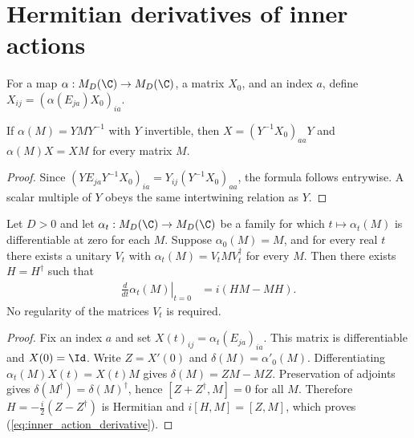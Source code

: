\section{Hermitian derivatives of inner actions}
\label{sec:hermitian_inner_action_derivatives}

\begin{definition}
    \label{def:matrix_unit_conjugator}
    \leanok
    For a map $\alpha:M_D(\C)\to M_D(\C)$, a matrix $X_0$, and an
    index $a$, define $X_{ij}=(\alpha(E_{ja})X_0)_{ia}$.
\end{definition}

\begin{theorem}
    \label{thm:matrix_unit_conjugator_intertwines}
    \leanok
    If $\alpha(M)=YMY^{-1}$ with $Y$ invertible, then
    $X=(Y^{-1}X_0)_{aa}Y$ and $\alpha(M)X=XM$ for every matrix $M$.
\end{theorem}
\begin{proof}\leanok
    Since $(YE_{ja}Y^{-1}X_0)_{ia}=Y_{ij}(Y^{-1}X_0)_{aa}$,
    the formula follows entrywise. A scalar multiple of $Y$ obeys
    the same intertwining relation as $Y$.
\end{proof}

\begin{theorem}
    \label{thm:hermitian_inner_action_derivative}
    \leanok
    Let $D>0$ and let $\alpha_t:M_D(\C)\to M_D(\C)$ be a family
    for which $t\mapsto\alpha_t(M)$ is differentiable at zero for each $M$.
    Suppose $\alpha_0(M)=M$, and for every real $t$ there exists a unitary
    $V_t$ with $\alpha_t(M)=V_tMV_t^\dagger$ for every $M$.
    Then there exists $H=H^\dagger$ such that
    \begin{align}
        \left.\frac{d}{dt}\alpha_t(M)\right|_{t=0}
         & =i(HM-MH).
        \label{eq:inner_action_derivative}
    \end{align}
    No regularity of the matrices $V_t$ is required.
\end{theorem}
\begin{proof}\leanok
    Fix an index $a$ and set $X(t)_{ij}=\alpha_t(E_{ja})_{ia}$.
    This matrix is differentiable and $X(0)=\Id$. Write $Z=X'(0)$ and
    $\delta(M)=\alpha'_0(M)$. Differentiating
    $\alpha_t(M)X(t)=X(t)M$ gives $\delta(M)=ZM-MZ$.
    Preservation of adjoints gives $\delta(M^\dagger)=\delta(M)^\dagger$,
    hence $[Z+Z^\dagger,M]=0$ for all $M$.
    Therefore $H=-\frac{i}{2}(Z-Z^\dagger)$ is Hermitian and
    $i[H,M]=[Z,M]$, which proves (\ref{eq:inner_action_derivative}).
\end{proof}
